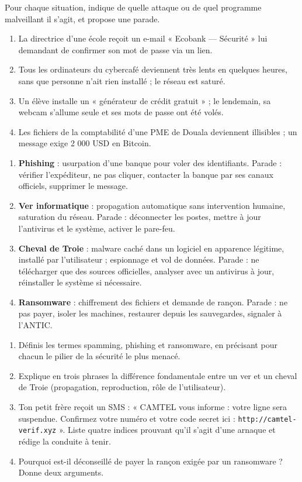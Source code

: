 \documentclass[11pt]{article}
\newcommand{\cle}[1]{{\popxbold\color{popdark}#1}}
\begin{document}
\begin{exoresolu}
Pour chaque situation, indique de quelle attaque ou de quel programme malveillant il s'agit, et propose une parade.
\begin{enumerate}
  \item La directrice d'une école reçoit un e-mail « Ecobank — Sécurité » lui demandant de confirmer son mot de passe via un lien.
  \item Tous les ordinateurs du cybercafé deviennent très lents en quelques heures, sans que personne n'ait rien installé ; le réseau est saturé.
  \item Un élève installe un « générateur de crédit gratuit » ; le lendemain, sa webcam s'allume seule et ses mots de passe ont été volés.
  \item Les fichiers de la comptabilité d'une PME de Douala deviennent illisibles ; un message exige 2 000 USD en Bitcoin.
\end{enumerate}
\tcblower
\begin{enumerate}
  \item \textbf{Phishing} : usurpation d'une banque pour voler des identifiants. Parade : vérifier l'expéditeur, ne pas cliquer, contacter la banque par ses canaux officiels, supprimer le message.
  \item \textbf{Ver informatique} : propagation automatique sans intervention humaine, saturation du réseau. Parade : déconnecter les postes, mettre à jour l'antivirus et le système, activer le pare-feu.
  \item \textbf{Cheval de Troie} : malware caché dans un logiciel en apparence légitime, installé par l'utilisateur ; espionnage et vol de données. Parade : ne télécharger que des sources officielles, analyser avec un antivirus à jour, réinstaller le système si nécessaire.
  \item \textbf{Ransomware} : chiffrement des fichiers et demande de rançon. Parade : ne pas payer, isoler les machines, restaurer depuis les sauvegardes, signaler à l'ANTIC.
\end{enumerate}
\end{exoresolu}

\begin{exercice}
\begin{enumerate}
  \item Définis les termes \cle{spamming}, \cle{phishing} et \cle{ransomware}, en précisant pour chacun le pilier de la sécurité le plus menacé.
  \item Explique en trois phrases la différence fondamentale entre un ver et un cheval de Troie (propagation, reproduction, rôle de l'utilisateur).
  \item Ton petit frère reçoit un SMS : « CAMTEL vous informe : votre ligne sera suspendue. Confirmez votre numéro et votre code secret ici : \texttt{http://camtel-verif.xyz} ». Liste quatre indices prouvant qu'il s'agit d'une arnaque et rédige la conduite à tenir.
  \item Pourquoi est-il déconseillé de payer la rançon exigée par un ransomware ? Donne deux arguments.
\end{enumerate}
\end{exercice}
\end{document}

